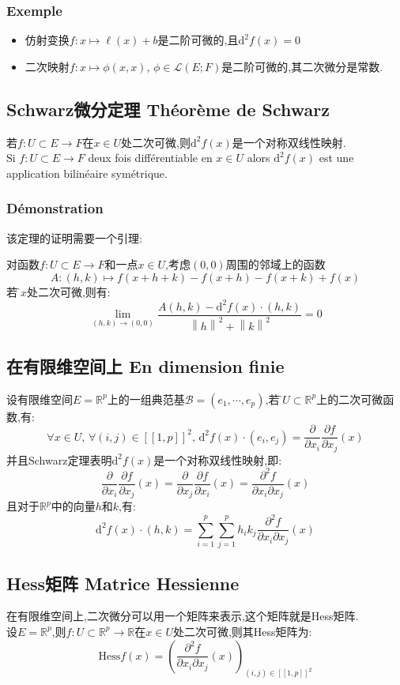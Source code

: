 \documentclass[12pt, a4paper, oneside]{ctexbook}
\newcommand{\di }{\text{d}}%
\newcommand{\pian }{\partial}%
\newcommand{\R }{\mathbb{R}}%
\newcommand{\Hess }{\text{Hess}}%
\begin{document}
  \subsubsection{Exemple}
  \begin{itemize}
    \item 仿射变换$f:x\mapsto \ell(x)+b$是二阶可微的,且$\di^2f(x)=0$
    \item 二次映射$f:x\mapsto \phi(x,x),\,\phi\in\mathcal{L}(E;F)$是二阶可微的,其二次微分是常数.
  \end{itemize}

\subsection{Schwarz微分定理 Théorème de Schwarz}
  若$f:U\subset E\rightarrow F$在$x\in U$处二次可微,则$\di^2f(x)$是一个对称双线性映射.\\
  \indent
  Si $f:U\subset E\rightarrow F$ deux fois différentiable en $x\in U$ alors $\di^2f(x)$ est une application bilinéaire symétrique.
  \subsubsection{Démonstration}
  该定理的证明需要一个引理:


  对函数$f:U\subset E\rightarrow F$和一点$x\in U$,考虑$(0,0)$周围的邻域上的函数
  $$
    A:(h,k)\mapsto f(x+h+k)-f(x+h)-f(x+k)+f(x)
  $$
  若\f 在$x$处二次可微,则有:
  $$
    \lim_{(h,k)\rightarrow(0,0)}\frac{A(h,k)-\di^2f(x)\cdot(h,k)}{\left\lVert h\right\rVert^2+\left\lVert k\right\rVert^2}=0
  $$
\subsection{在有限维空间上 En dimension finie}
  设有限维空间$E=\R^p$上的一组典范基$\mathcal{B}=(e_1,\cdots,e_p)$,若\f 是$U\subset \R^p$上的二次可微函数,有:
  $$
    \forall x\in U,\,\forall(i,j)\in[\![1,p]\!]^2,\, \di^2f(x)\cdot(e_i,e_j)=\frac{\pian}{\pian x_i}\frac{\pian f}{\pian x_j}(x)
  $$
  并且Schwarz定理表明$\di^2f(x)$是一个对称双线性映射,即:
  $$
    \frac{\pian}{\pian x_i}\frac{\pian f}{\pian x_j}(x)=\frac{\pian}{\pian x_j}\frac{\pian f}{\pian x_i}(x)=\frac{\pian^2f}{\pian x_i\pian x_j}(x)
  $$
  且对于$\R^p$中的向量$h$和$k$,有:
  $$
    \di^2f(x)\cdot(h,k)=\sum_{i=1}^p\sum_{j=1}^ph_ik_j\frac{\pian^2f}{\pian x_i\pian x_j}(x)
  $$
\subsection{Hess矩阵 Matrice Hessienne}
  在有限维空间上,二次微分可以用一个矩阵来表示,这个矩阵就是Hess矩阵.\\
  \indent
  设$E=\R^p$,则$f:U\subset \R^p\rightarrow \R$在$x\in U$处二次可微,则其Hess矩阵为:
  $$
    \Hess f(x)=\left(\frac{\pian^2f}{\pian x_i\pian x_j}(x)\right)_{(i,j)\in[\![1,p]\!]^2}
  $$
\end{document}
